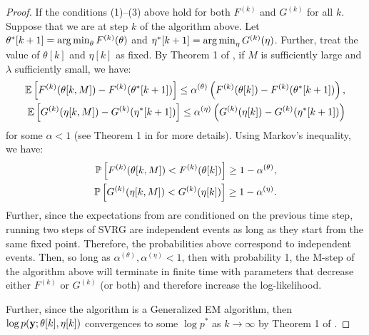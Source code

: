 \begin{proof}
If the conditions (1)--(3) above hold for both $F^{(k)}$ and $G^{(k)}$ for all $k$. Suppose that we are at step $k$ of the algorithm above. Let $\theta^*[k+1] = \operatorname*{arg\,min}_\theta F^{(k)}(\theta)$ and $\eta^*[k+1] = \operatorname*{arg\,min}_\eta G^{(k)}(\eta)$. Further, treat the value of $\theta[k]$ and $\eta[k]$ as fixed. By Theorem 1 of \citet{Johnson:2013}, if $M$ is sufficiently large and $\lambda$ sufficiently small, we have: 
%
\begin{align*}
    \mathbb{E}\left[F^{(k)}(\theta[k,M]) - F^{(k)}(\theta^*[k+1])\right] \leq \alpha^{(\theta)} \left(F^{(k)}(\theta[k]) - F^{(k)}(\theta^*[k+1])\right), \\
    \mathbb{E}\left[G^{(k)}(\eta[k,M]) - G^{(k)}(\eta^*[k+1])\right] \leq \alpha^{(\eta)} \left(G^{(k)}(\eta[k]) - G^{(k)}(\eta^*[k+1])\right)
\end{align*}
%
for some $\alpha < 1$ (see Theorem 1 in \citet{Johnson:2013} for more details). Using Markov's inequality, we have:
\begin{align*}
    \mathbb{P}\left[F^{(k)}(\theta[k,M]) < F^{(k)}(\theta[k])\right] \geq 1-\alpha^{(\theta)}, \\
    \mathbb{P}\left[G^{(k)}(\eta[k,M]) < G^{(k)}(\eta[k])\right] \geq 1-\alpha^{(\eta)}.
\end{align*}
Further, since the expectations from \citet{Johnson:2013} are conditioned on the previous time step, running two steps of SVRG are independent events as long as they start from the same fixed point. Therefore, the probabilities above correspond to independent events. Then, so long as $\alpha^{(\theta)},\alpha^{(\eta)} < 1$, then with probability 1, the M-step of the algorithm above will terminate in finite time with parameters that decrease either $F^{(k)}$ or $G^{(k)}$ (or both) and therefore increase the log-likelihood.

Further, since the algorithm is a Generalized EM algorithm, then $\log p(\mathbf{y} ; \theta[k],\eta[k])$ convergences to some $\log p^*$ as $k \to \infty$ by Theorem 1 of \citep{Wu:1983}.
\end{proof}


